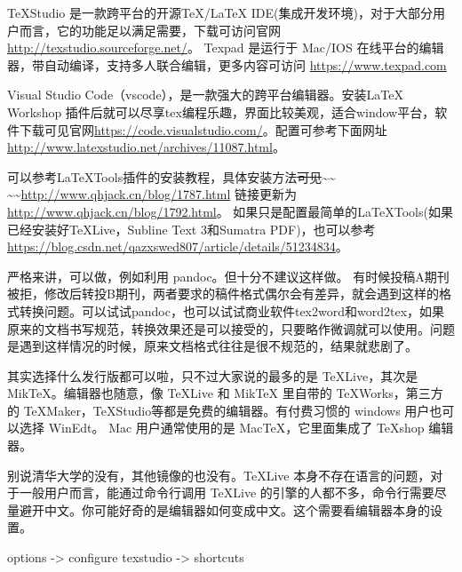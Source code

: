 TeXStudio 是一款跨平台的开源TeX/LaTeX
IDE(集成开发环境)，对于大部分用户而言，它的功能足以满足需要，下载可访问官网
\url{http://texstudio.sourceforge.net/}。 Texpad 是运行于 Mac/IOS
在线平台的编辑器，带自动编译，支持多人联合编辑，更多内容可访问
\url{https://www.texpad.com}

Visual Studio Code（vscode），是一款强大的跨平台编辑器。安装LaTeX Workshop
插件后就可以尽享tex编程乐趣，界面比较美观，适合window平台，软件下载可见官网\url{https://code.visualstudio.com/}。配置可参考下面网址\url{http://www.latexstudio.net/archives/11087.html}。



可以参考LaTeXTools插件的安装教程，具体安装方法\sout{可见}\textasciitilde{}\textasciitilde{}
\textasciitilde{}\textasciitilde{}\url{http://www.qhjack.cn/blog/1787.html}
链接更新为\url{http://www.qhjack.cn/blog/1792.html}。
如果只是配置最简单的LaTeXTools(如果已经安装好TeXLive，Subline Text
3和Sumatra
PDF)，也可以参考\url{https://blog.csdn.net/qazxswed807/article/details/51234834}。



严格来讲，可以做，例如利用 pandoc。但十分不建议这样做。
有时候投稿A期刊被拒，修改后转投B期刊，两者要求的稿件格式偶尔会有差异，就会遇到这样的格式转换问题。可以试试pandoc，也可以试试商业软件tex2word和word2tex，如果原来的文档书写规范，转换效果还是可以接受的，只要略作微调就可以使用。问题是遇到这样情况的时候，原来文档格式往往是很不规范的，结果就悲剧了。



其实选择什么发行版都可以啦，只不过大家说的最多的是 TeXLive，其次是
MikTeX。编辑器也随意，像 TeXLive 和 MikTeX 里自带的 TeXWorks，第三方的
TeXMaker，TeXStudio等都是免费的编辑器。有付费习惯的 windows
用户也可以选择 WinEdt。 Mac 用户通常使用的是 MacTeX，它里面集成了
TeXshop 编辑器。



别说清华大学的没有，其他镜像的也没有。TeXLive
本身不存在语言的问题，对于一般用户而言，能通过命令行调用 TeXLive
的引擎的人都不多，命令行需要尽量避开中文。你可能好奇的是编辑器如何变成中文。这个需要看编辑器本身的设置。



options -\textgreater{} configure texstudio -\textgreater{} shortcuts



